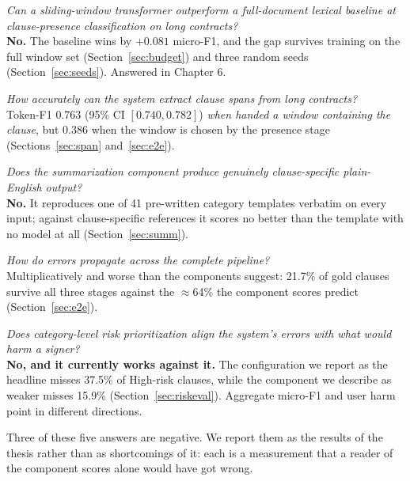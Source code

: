 \begin{description}[itemsep=4pt, leftmargin=1.6cm]
  \item[RQ1] \emph{Can a sliding-window transformer outperform a full-document lexical baseline at clause-presence classification on long contracts?}\\
  \textbf{No.} The baseline wins by $+0.081$ micro-F1, and the gap survives training on the full window set (Section~\ref{sec:budget}) and three random seeds (Section~\ref{sec:seeds}). Answered in Chapter 6.
  \item[RQ2] \emph{How accurately can the system extract clause spans from long contracts?}\\
  Token-F1 0.763 (95\% CI $[0.740, 0.782]$) \emph{when handed a window containing the clause}, but 0.386 when the window is chosen by the presence stage (Sections~\ref{sec:span} and~\ref{sec:e2e}).
  \item[RQ3] \emph{Does the summarization component produce genuinely clause-specific plain-English output?}\\
  \textbf{No.} It reproduces one of 41 pre-written category templates verbatim on every input; against clause-specific references it scores no better than the template with no model at all (Section~\ref{sec:summ}).
  \item[RQ4] \emph{How do errors propagate across the complete pipeline?}\\
  Multiplicatively and worse than the components suggest: 21.7\% of gold clauses survive all three stages against the $\approx$64\% the component scores predict (Section~\ref{sec:e2e}).
  \item[RQ5] \emph{Does category-level risk prioritization align the system's errors with what would harm a signer?}\\
  \textbf{No, and it currently works against it.} The configuration we report as the headline misses 37.5\% of High-risk clauses, while the component we describe as weaker misses 15.9\% (Section~\ref{sec:riskeval}). Aggregate micro-F1 and user harm point in different directions.
\end{description}

Three of these five answers are negative. We report them as the results of the thesis rather than as shortcomings of it: each is a measurement that a reader of the component scores alone would have got wrong.

